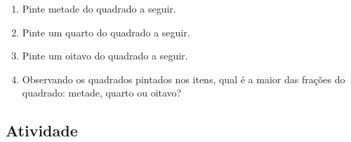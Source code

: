 \documentclass[a4,12pt]{book}
\begin{document}
\begin{enumerate} [\quad a)] %
  \item     Pinte metade do quadrado a seguir.
  
  \begin{center}
  \end{center}
 
  \item     Pinte um quarto do quadrado a seguir.
  
  \begin{center}
  \end{center}

  \item     Pinte um oitavo do quadrado a seguir.
  
  \begin{center}
  \end{center}
  \item     Observando os quadrados pintados nos itens, qual é a maior das frações do quadrado: metade, quarto ou oitavo?
\end{enumerate} %


\subsection{Atividade}
\end{document}
